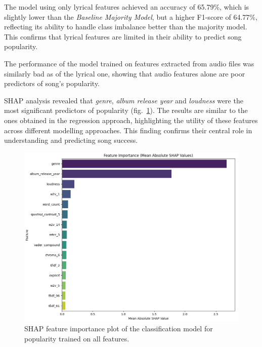 The model using only lyrical features achieved an accuracy of 65.79\%, which is
slightly lower than the \textit{Baseline Majority Model}, but a higher F1-score
of 64.77\%, reflecting its ability to handle class imbalance better than the
majority model. This confirms that lyrical features are limited in their
ability to predict song popularity.


The performance of the model trained on features extracted from audio files was
similarly bad as of the lyrical one, showing that audio features alone are 
poor predictors of song's popularity.


SHAP analysis revealed that \textit{genre}, \textit{album release year} and
\textit{loudness} were the most significant predictors of
popularity (fig.~\ref{Figure:feature_importance_popularity_clf}). The results are
similar to the ones obtained in the regression approach, highlighting the
utility of  these features across different modelling approaches. This finding
confirms their central role in understanding and predicting song success.

\begin{center}
\begin{figure}[H]
  \centering
  \includegraphics[width=6in]{img/feature_importance_popularity_clf.png}
  \caption{SHAP feature importance plot of the classification model for popularity trained on all features.}
  \label{Figure:feature_importance_popularity_clf}
\end{figure}
\end{center}

